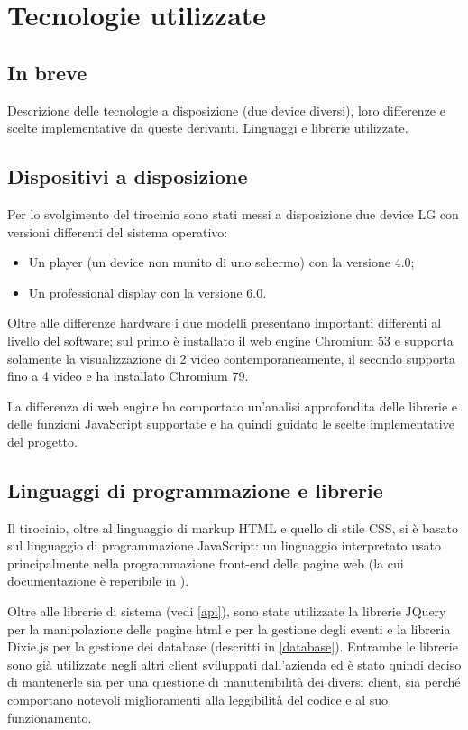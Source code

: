 \chapter{Tecnologie utilizzate}

\section{In breve}
Descrizione delle tecnologie a disposizione (due device diversi), loro differenze e scelte implementative da queste derivanti. Linguaggi e librerie utilizzate. 

\section{Dispositivi a disposizione}
Per lo svolgimento del tirocinio sono stati messi a disposizione due device LG con versioni differenti del sistema operativo:
\begin{itemize}
    \item Un player (un device non munito di uno schermo) con la versione 4.0;
    \item Un professional display con la versione 6.0.
\end{itemize}

Oltre alle differenze hardware i due modelli presentano importanti differenti al livello del software; sul primo è installato il web engine Chromium 53 e supporta solamente la visualizzazione di 2 video contemporaneamente, il secondo supporta fino a 4 video e ha installato Chromium 79.

La differenza di web engine ha comportato un'analisi approfondita delle librerie e delle funzioni JavaScript supportate e ha quindi guidato le scelte implementative del progetto.


\section{Linguaggi di programmazione e librerie}

Il tirocinio, oltre al linguaggio di markup HTML e quello di stile CSS, si è basato sul linguaggio di programmazione JavaScript: un linguaggio interpretato usato principalmente nella programmazione front-end delle pagine web (la cui documentazione è reperibile in \cite{MdN}).

Oltre alle librerie di sistema (vedi \ref{api}), sono state utilizzate la librerie JQuery \cite{jQDoc} per la manipolazione delle pagine html e per la gestione degli eventi e la libreria Dixie.js \cite{dixie} per la gestione dei database (descritti in \ref*{database}). Entrambe le librerie sono già utilizzate negli altri client sviluppati dall'azienda ed è stato quindi deciso di mantenerle sia per una questione di manutenibilità dei diversi client, sia perché comportano notevoli miglioramenti alla leggibilità del codice e al suo funzionamento.

